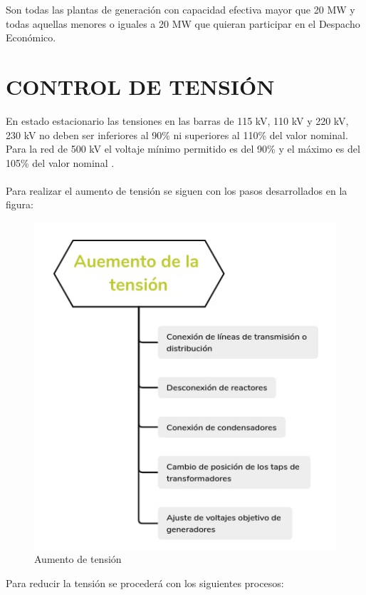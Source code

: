 \documentclass[a5paper]{book}%
\begin{document}
 Son todas las plantas de generación con capacidad efectiva mayor que 20 MW y todas aquellas menores o iguales a 20 MW que quieran participar en el Despacho Económico. 


\chapter{CONTROL DE TENSIÓN}

En estado estacionario las tensiones en las barras de 115 kV,
  110 kV y 220 kV, 230 kV no deben ser inferiores al 90\% ni
  superiores al 110\% del valor nominal. Para la red de 500 kV el
  voltaje mínimo permitido es del 90\% y el máximo es del 105\% del
  valor nominal \cite{CREG0251995}.\\\\

Para realizar el aumento de tensión se siguen con los pasos desarrollados en la figura:

\begin{figure}[H]
  \centering
  \caption{Aumento de tensión}
  \label{fig:aumentotension}
  \includegraphics[width=0.8\linewidth]{aumentartension}
\end{figure}

Para reducir la tensión se procederá con los siguientes procesos:
\end{document}
